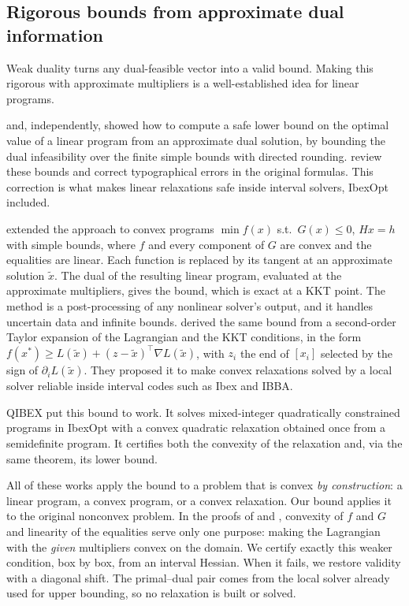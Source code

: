 \documentclass[11pt]{article}
\begin{document}
\subsection{Rigorous bounds from approximate dual information}

Weak duality turns any dual-feasible vector into a valid bound. Making this rigorous
with approximate multipliers is a well-established idea for linear programs.

\citet{NeumaierShcherbina2004} and, independently, \citet{Jansson2004lp} showed how to
compute a safe lower bound on the optimal value of a linear program from an approximate
dual solution, by bounding the dual infeasibility over the finite simple bounds with
directed rounding. \citet{Guilbeau} review these bounds and correct typographical errors
in the original formulas. This correction is what makes linear relaxations safe inside
interval solvers, IbexOpt included.

\citet{Jansson2004convex} extended the approach to convex programs
$\min f(x)$ s.t.\ $G(x) \le 0$, $Hx = h$ with simple bounds, where $f$ and every
component of $G$ are convex and the equalities are linear. Each function is replaced by
its tangent at an approximate solution $\tilde x$. The dual of the resulting linear
program, evaluated at the approximate multipliers, gives the bound, which is exact at a
KKT point. The method is a post-processing of any nonlinear solver's output, and it
handles uncertain data and infinite bounds.
\citet{MessineTrombettoni2019} derived the same bound from a second-order Taylor
expansion of the Lagrangian and the KKT conditions, in the form
$f(x^*) \ge L(\tilde x) + (z - \tilde x)^\top \nabla L(\tilde x)$, with $z_i$ the end
of $[x_i]$ selected by the sign of $\partial_i L(\tilde x)$. They proposed it to make
convex relaxations solved by a local solver reliable inside interval codes such as Ibex
and IBBA.

QIBEX \citep{Elloumi2025} put this bound to work. It solves mixed-integer quadratically
constrained programs in IbexOpt with a convex quadratic relaxation obtained once from a
semidefinite program. It certifies both the convexity of the relaxation and, via the
same theorem, its lower bound.

All of these works apply the bound to a problem that is convex \emph{by construction}:
a linear program, a convex program, or a convex relaxation. Our bound applies it to the
original nonconvex problem. In the proofs of \citet{Jansson2004convex} and
\citet{MessineTrombettoni2019}, convexity of $f$ and $G$ and linearity of the equalities
serve only one purpose: making the Lagrangian with the \emph{given} multipliers convex
on the domain. We certify exactly this weaker condition, box by box, from an interval
Hessian. When it fails, we restore validity with a diagonal shift. The primal--dual pair
comes from the local solver already used for upper bounding, so no relaxation is built
or solved.
\end{document}
